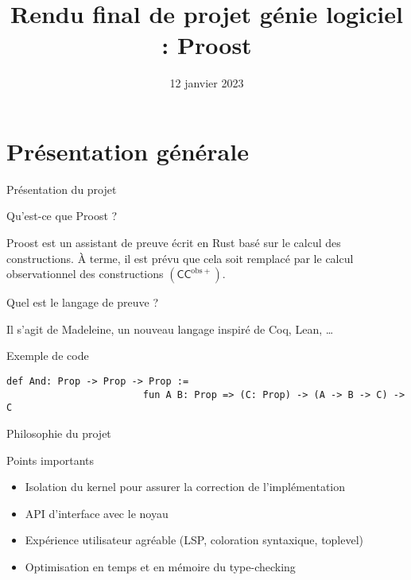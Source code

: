 \documentclass[12pt, aspectratio=169]{beamer}
\title[Rendu final : Proost]{Rendu final de projet génie logiciel : Proost}
\author[Projet génie logiciel]{
    \normalsize
    Arthur~Adjedj \and
    Augustin~Albert \and \\
    Vincent~Lafeychine \and
    Lucas~Tabary-Maujean \and \\ \vspace{0.2cm}
    {\footnotesize
      Jean~Abou-Samra \and
      Tanguy~Bozec \and
      Antonin~Bretagne \and
      Vivien~Ducros \and
      Antoine~Guilmin-Crépon \and
      Balthazar~Patiachvili}
}
\date{12 janvier 2023}
\institute[]{ENS Paris-Saclay}
\begin{document}
    \beamertemplatenavigationsymbolsempty
    \maketitle

    \section{Présentation générale}

        \begin{frame}[fragile]{Présentation du projet}

            \begin{block}{Qu'est-ce que Proost ?}

                Proost est un assistant de preuve écrit en Rust basé sur le calcul des constructions. À terme, il est prévu que cela soit remplacé par le calcul observationnel des constructions $\left(\mathsf{CC}^{\mathrm{obs}+}\right)$.

            \end{block} \pause

            \begin{block}{Quel est le langage de preuve ?}

                Il s'agit de Madeleine, un nouveau langage inspiré de Coq, Lean, \dots

            \end{block} \pause

            \begin{exampleblock}{Exemple de code}

                \begin{lstlisting}[language=mdln]
                    def And: Prop -> Prop -> Prop :=
                        fun A B: Prop => (C: Prop) -> (A -> B -> C) -> C
                \end{lstlisting}

            \end{exampleblock}

        \end{frame}

        \begin{frame}{Philosophie du projet}

            \begin{alertblock}{Points importants}

                \begin{itemize}
                    \item Isolation du kernel pour assurer la correction de l'implémentation \pause
                    \item API d'interface avec le noyau \pause
                    \item Expérience utilisateur agréable (LSP, coloration syntaxique, toplevel) \pause
                    \item Optimisation en temps et en mémoire du type-checking
                \end{itemize}

            \end{alertblock}

        \end{frame}
\end{document}

